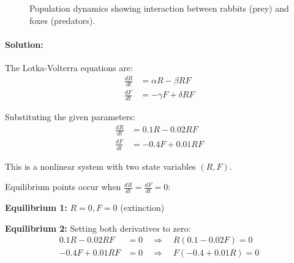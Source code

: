 \documentclass[11pt,a4paper]{article}
\begin{document}
\begin{figure}[h]
\centering
{}
\caption{Population dynamics showing interaction between rabbits (prey) and foxes (predators).}
\end{figure}

\paragraph{Solution:}

The Lotka-Volterra equations are:
\begin{align}
\frac{dR}{dt} &= \alpha R - \beta RF \\
\frac{dF}{dt} &= -\gamma F + \delta RF
\end{align}

Substituting the given parameters:
\begin{align}
\frac{dR}{dt} &= 0.1R - 0.02RF \\
\frac{dF}{dt} &= -0.4F + 0.01RF
\end{align}

This is a nonlinear system with two state variables $(R, F)$.

Equilibrium points occur when $\frac{dR}{dt} = \frac{dF}{dt} = 0$:

\textbf{Equilibrium 1:} $R = 0, F = 0$ (extinction)

\textbf{Equilibrium 2:} Setting both derivatives to zero:
\begin{align}
0.1R - 0.02RF &= 0 \quad \Rightarrow \quad R(0.1 - 0.02F) = 0 \\
-0.4F + 0.01RF &= 0 \quad \Rightarrow \quad F(-0.4 + 0.01R) = 0
\end{align}
\end{document}
